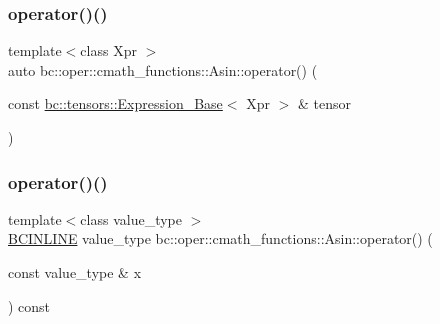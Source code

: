 \mbox{\label{structbc_1_1oper_1_1cmath__functions_1_1Asin_a2f20510e74c4dd76adf0c75d86689517}} 
\subsubsection{\texorpdfstring{operator()()}{operator()()}\hspace{0.1cm}{\footnotesize\ttfamily [2/3]}}
{\footnotesize\ttfamily template$<$class Xpr $>$ \\
auto bc\+::oper\+::cmath\+\_\+functions\+::\+Asin\+::operator() (\begin{DoxyParamCaption}\item[{const \hyperlink{classbc_1_1tensors_1_1Expression__Base}{bc\+::tensors\+::\+Expression\+\_\+\+Base}$<$ Xpr $>$ \&}]{tensor }\end{DoxyParamCaption})\hspace{0.3cm}{\ttfamily [inline]}}

\mbox{\label{structbc_1_1oper_1_1cmath__functions_1_1Asin_af8ec5551f6ea246e1803a729d3310f0c}} 
\subsubsection{\texorpdfstring{operator()()}{operator()()}\hspace{0.1cm}{\footnotesize\ttfamily [3/3]}}
{\footnotesize\ttfamily template$<$class value\+\_\+type $>$ \\
\hyperlink{common_8h_a6699e8b0449da5c0fafb878e59c1d4b1}{B\+C\+I\+N\+L\+I\+NE} value\+\_\+type bc\+::oper\+::cmath\+\_\+functions\+::\+Asin\+::operator() (\begin{DoxyParamCaption}\item[{const value\+\_\+type \&}]{x }\end{DoxyParamCaption}) const\hspace{0.3cm}{\ttfamily [inline]}}



